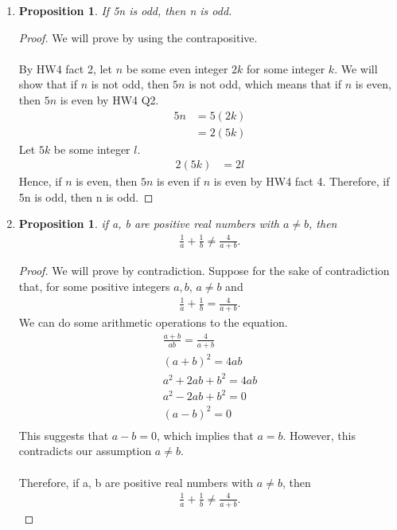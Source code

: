 \documentclass{article}
\newtheorem{prop}[thm]{Proposition}
\begin{document}
\begin{enumerate}
\item \begin{prop}
If 5n is odd, then n is odd.
\end{prop}
\begin{proof}
We will prove by using the contrapositive. \\\\
By HW4 fact 2, let $n$ be some even integer $2k$ for some integer $k$. We will show that if $n$ is not odd, then $5n$ is not odd, which means that if $n$ is even, then $5n$ is even by HW4 Q2. 
\begin{align}
    5n &= 5(2k) \\
    &= 2(5k)
\end{align}
Let $5k$ be some integer $l$.
\begin{align}
    2(5k) &= 2l
\end{align}
Hence, if $n$ is even, then $5n$ is even if $n$ is even by HW4 fact 4.
Therefore, if 5n is odd, then n is odd.
\end{proof}

\item \begin{prop}
     if a, b are positive real numbers with $a \neq b$, then
     \begin{gather}
         \frac{1}{a} + \frac{1}{b} \neq \frac{4}{a + b}.
     \end{gather}
\end{prop}

\begin{proof}
    We will prove by contradiction. Suppose for the sake of contradiction that, for some positive integers $a, b$, $a \neq b$ and
    \begin{gather}
         \frac{1}{a} + \frac{1}{b} = \frac{4}{a + b}.
    \end{gather}
     We can do some arithmetic operations to the equation.
    \begin{gather}
        \frac{a + b}{ab} = \frac{4}{a + b} \\
        (a + b)^2 = 4ab \\
        a^2 + 2ab + b^2 = 4ab \\
        a^2 - 2ab + b^2 = 0 \\
        (a - b)^2 = 0 \\
    \end{gather}
    This suggests that $a - b = 0$, which implies that $a = b$. However, this contradicts our assumption $a \neq b$. \\\\
    Therefore, if a, b are positive real numbers with $a \neq b$, then
     \begin{gather}
         \frac{1}{a} + \frac{1}{b} \neq \frac{4}{a + b}.
     \end{gather}
\end{proof}


\end{enumerate}
\end{document}
